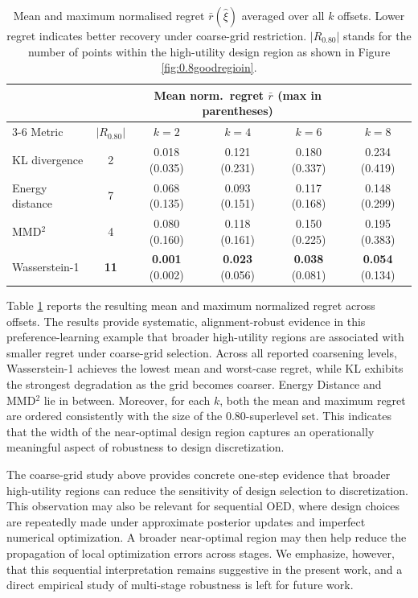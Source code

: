 \documentclass[twoside,11pt]{article}
\begin{document}
\begin{table}[h]
  \centering
  \caption{Mean and maximum normalised regret $\bar{r}(\hat\xi)$ averaged over all $k$ offsets. Lower regret indicates better recovery under coarse-grid restriction. $|R_{0.80}|$ stands for the number of points within the high-utility design region as shown in Figure \ref{fig:0.8goodregioin}.}
  \label{tab:coarse_design}
  \begin{tabular}{lc cccc}
    \toprule
    & & \multicolumn{3}{c}{Mean norm.\ regret $\bar{r}$ (max in parentheses)} \\
    \cmidrule(lr){3-6}
    Metric & $|R_{0.80}|$
           & $k=2$ & $k=4$ & $k=6$ & $k=8$ \\
    \midrule
    KL divergence
      & 2
      & 0.018 (0.035) & 0.121 (0.231) & 0.180 (0.337) & 0.234 (0.419) \\
    Energy distance
      & 7
      & 0.068 (0.135) & 0.093 (0.151) & 0.117 (0.168) & 0.148 (0.299) \\
    MMD$^2$
      & 4
      & 0.080 (0.160) & 0.118 (0.161) & 0.150 (0.225) & 0.195 (0.383) \\
    Wasserstein-1
      & \textbf{11}
      & \textbf{0.001} (0.002) & \textbf{0.023} (0.056)
      & \textbf{0.038} (0.081) & \textbf{0.054} (0.134) \\
    \bottomrule
  \end{tabular}
\end{table}

Table \ref{tab:coarse_design} reports the resulting mean and maximum normalized regret across offsets. The results provide systematic, alignment-robust evidence in this preference-learning example that broader high-utility regions are associated with smaller regret under coarse-grid selection. Across all reported coarsening levels, Wasserstein-1 achieves the lowest mean and worst-case regret, while KL exhibits the strongest degradation as the grid becomes coarser. Energy Distance and MMD$^2$ lie in between. Moreover, for each $k$, both the mean and maximum regret are ordered consistently with the size of the $0.80$-superlevel set. This indicates that the width of the near-optimal design region captures an operationally meaningful aspect of robustness to design discretization.

The coarse-grid study above provides concrete one-step evidence that broader high-utility regions can reduce the sensitivity of design selection to discretization. This observation may also be relevant for sequential OED, where design choices are repeatedly made under approximate posterior updates and imperfect numerical optimization. A broader near-optimal region may then help reduce the propagation of local optimization errors across stages. We emphasize, however, that this sequential interpretation remains suggestive in the present work, and a direct empirical study of multi-stage robustness is left for future work.
\end{document}

